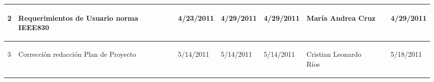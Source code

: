 \begin{center}
\begin{longtable}{|p{}|p{}|p{}|p{}|p{}|p{}|p{}|p{}|}
{\begin{center} 2 \end{center}} & 
{\begin{center} Requerimientos de Usuario norma IEEE830 \end{center}} & 
{\begin{center} 4/23/2011 \end{center}} & 
{\begin{center} 4/29/2011 \end{center}} & 
{\begin{center} 4/29/2011 \end{center}} & 
{\begin{center} María Andrea Cruz \end{center}} & 
{\begin{center}  \end{center}} & 
{\begin{center} 4/29/2011 \end{center}}\\
\hline	


{\begin{center} 3 \end{center}} & 
{\begin{center} Corrección redacción Plan de Proyecto \end{center}} & 
{\begin{center} 5/14/2011 \end{center}} & 
{\begin{center} 5/14/2011 \end{center}} & 
{\begin{center} 5/14/2011 \end{center}} & 
{\begin{center} Cristian Leonardo Ríos \end{center}} & 
{\begin{center}  \end{center}} & 
{\begin{center} 5/18/2011 \end{center}}\\
\hline		


\end{longtable}
\end{center}
